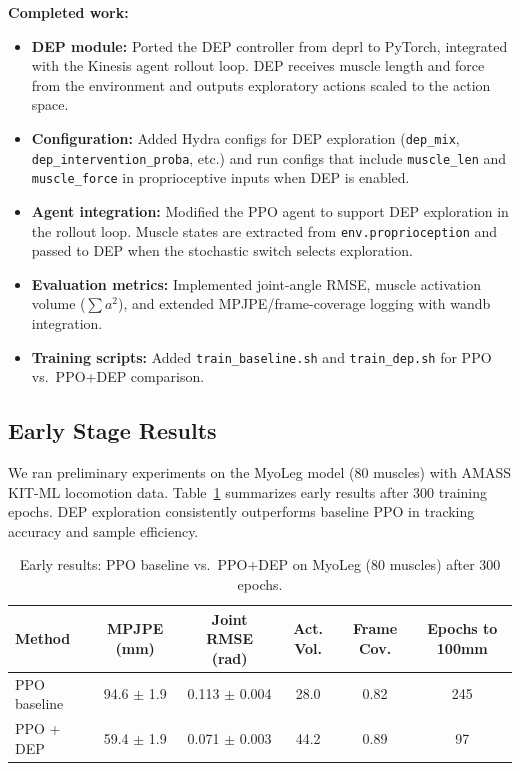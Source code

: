 \documentclass{article}
\begin{document}
\textbf{Completed work:}
\begin{itemize}
    \item \textbf{DEP module:} Ported the DEP controller from deprl to PyTorch, integrated with the Kinesis agent rollout loop. DEP receives muscle length and force from the environment and outputs exploratory actions scaled to the action space.
    \item \textbf{Configuration:} Added Hydra configs for DEP exploration (\texttt{dep\_mix}, \texttt{dep\_intervention\_proba}, etc.) and run configs that include \texttt{muscle\_len} and \texttt{muscle\_force} in proprioceptive inputs when DEP is enabled.
    \item \textbf{Agent integration:} Modified the PPO agent to support DEP exploration in the rollout loop. Muscle states are extracted from \texttt{env.proprioception} and passed to DEP when the stochastic switch selects exploration.
    \item \textbf{Evaluation metrics:} Implemented joint-angle RMSE, muscle activation volume ($\sum a^2$), and extended MPJPE/frame-coverage logging with wandb integration.
    \item \textbf{Training scripts:} Added \texttt{train\_baseline.sh} and \texttt{train\_dep.sh} for PPO vs.\ PPO+DEP comparison.
\end{itemize}

\subsection{Early Stage Results}

We ran preliminary experiments on the MyoLeg model (80 muscles) with AMASS KIT-ML locomotion data. Table~\ref{tab:early} summarizes early results after 300 training epochs. DEP exploration consistently outperforms baseline PPO in tracking accuracy and sample efficiency.

\begin{table}[h]
\centering
\caption{Early results: PPO baseline vs.\ PPO+DEP on MyoLeg (80 muscles) after 300 epochs.}
\label{tab:early}
\begin{tabular}{lccccc}
\toprule
\textbf{Method} & \textbf{MPJPE (mm)} & \textbf{Joint RMSE (rad)} & \textbf{Act. Vol.} & \textbf{Frame Cov.} & \textbf{Epochs to 100mm} \\
\midrule
PPO baseline & 94.6 $\pm$ 1.9 & 0.113 $\pm$ 0.004 & 28.0 & 0.82 & 245 \\
PPO + DEP     & 59.4 $\pm$ 1.9 & 0.071 $\pm$ 0.003 & 44.2 & 0.89 & 97 \\
\bottomrule
\end{tabular}
\end{table}
\end{document}
